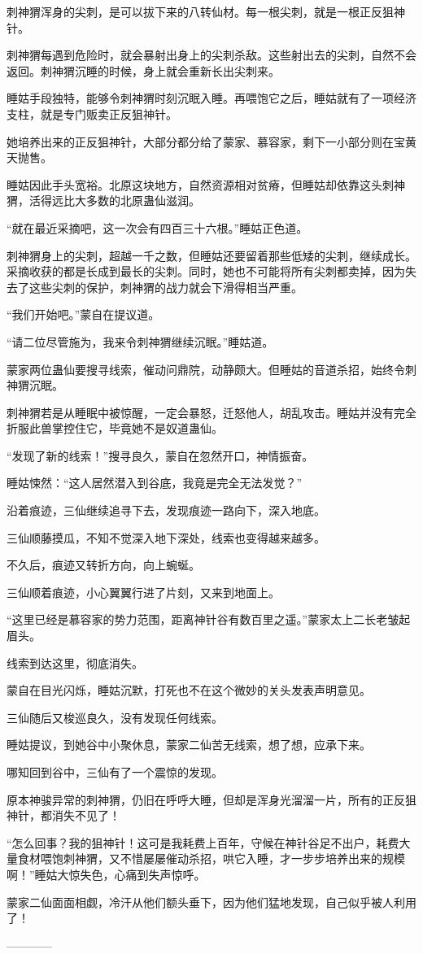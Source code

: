 \begin{this_body}
刺神猬浑身的尖刺，是可以拔下来的八转仙材。每一根尖刺，就是一根正反狙神针。

刺神猬每遇到危险时，就会暴射出身上的尖刺杀敌。这些射出去的尖刺，自然不会返回。刺神猬沉睡的时候，身上就会重新长出尖刺来。

睡姑手段独特，能够令刺神猬时刻沉眠入睡。再喂饱它之后，睡姑就有了一项经济支柱，就是专门贩卖正反狙神针。

她培养出来的正反狙神针，大部分都分给了蒙家、慕容家，剩下一小部分则在宝黄天抛售。

睡姑因此手头宽裕。北原这块地方，自然资源相对贫瘠，但睡姑却依靠这头刺神猬，活得远比大多数的北原蛊仙滋润。

“就在最近采摘吧，这一次会有四百三十六根。”睡姑正色道。

刺神猬身上的尖刺，超越一千之数，但睡姑还要留着那些低矮的尖刺，继续成长。采摘收获的都是长成到最长的尖刺。同时，她也不可能将所有尖刺都卖掉，因为失去了这些尖刺的保护，刺神猬的战力就会下滑得相当严重。

“我们开始吧。”蒙自在提议道。

“请二位尽管施为，我来令刺神猬继续沉眠。”睡姑道。

蒙家两位蛊仙要搜寻线索，催动问鼎院，动静颇大。但睡姑的音道杀招，始终令刺神猬沉眠。

刺神猬若是从睡眠中被惊醒，一定会暴怒，迁怒他人，胡乱攻击。睡姑并没有完全折服此兽掌控住它，毕竟她不是奴道蛊仙。

“发现了新的线索！”搜寻良久，蒙自在忽然开口，神情振奋。

睡姑悚然：“这人居然潜入到谷底，我竟是完全无法发觉？”

沿着痕迹，三仙继续追寻下去，发现痕迹一路向下，深入地底。

三仙顺藤摸瓜，不知不觉深入地下深处，线索也变得越来越多。

不久后，痕迹又转折方向，向上蜿蜒。

三仙顺着痕迹，小心翼翼行进了片刻，又来到地面上。

“这里已经是慕容家的势力范围，距离神针谷有数百里之遥。”蒙家太上二长老皱起眉头。

线索到达这里，彻底消失。

蒙自在目光闪烁，睡姑沉默，打死也不在这个微妙的关头发表声明意见。

三仙随后又梭巡良久，没有发现任何线索。

睡姑提议，到她谷中小聚休息，蒙家二仙苦无线索，想了想，应承下来。

哪知回到谷中，三仙有了一个震惊的发现。

原本神骏异常的刺神猬，仍旧在呼呼大睡，但却是浑身光溜溜一片，所有的正反狙神针，都消失不见了！

“怎么回事？我的狙神针！这可是我耗费上百年，守候在神针谷足不出户，耗费大量食材喂饱刺神猬，又不惜屡屡催动杀招，哄它入睡，才一步步培养出来的规模啊！”睡姑大惊失色，心痛到失声惊呼。

蒙家二仙面面相觑，冷汗从他们额头垂下，因为他们猛地发现，自己似乎被人利用了！

------------

\end{this_body}

